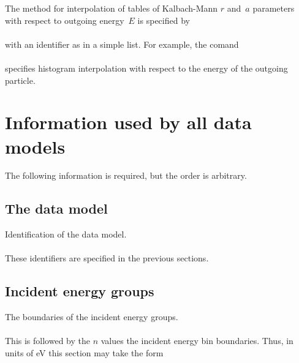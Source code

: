 The method for interpolation of tables of Kalbach-Mann $r$ and~$a$ parameters
with respect to outgoing energy~$E$ is specified by\\
   \\
with an identifier as in a simple list.  For example, the comand\\
   \\
specifies histogram interpolation with respect to the energy of
the outgoing particle.

\section{Information used by all data models}
The following information is required, but the order
is arbitrary.

\subsection{The data model} \label{data-model}
Identification of the data model.\\
  \\
These identifiers are specified in the previous sections.

\subsection{Incident energy groups}\label{Ein-bins}
The boundaries of the incident energy groups.\\
  \\
This is followed by the $n$ values the incident energy bin
boundaries.  Thus, in units of eV this section may take the form\\
  \\
  \\ 
  \\
   \Input{ \indent $\cdots$}{}\\

